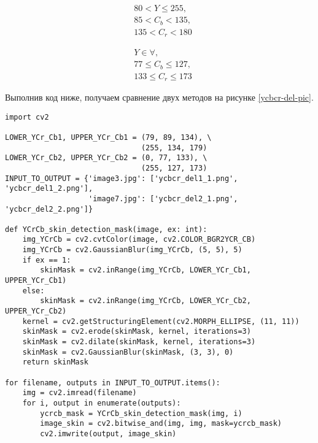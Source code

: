 \begin{equation}
	\begin{aligned}
		&80 < Y \leq 255, \\
		&85 < C_b < 135, \\
		&135 < C_r < 180 
	\end{aligned}
	\label{ycbcr-diap1}
\end{equation}

\begin{equation}
	\begin{aligned}
		&Y \in \forall,\\
		&77 \leq C_b \leq 127, \\
		&133 \leq C_r \leq 173 
	\end{aligned}
	\label{ycbcr-diap2}
\end{equation}

Выполнив код ниже, получаем сравнение двух методов на рисунке \ref{ycbcr-del-pic}.

\begin{verbatim}
import cv2

LOWER_YCr_Cb1, UPPER_YCr_Cb1 = (79, 89, 134), \
                               (255, 134, 179)
LOWER_YCr_Cb2, UPPER_YCr_Cb2 = (0, 77, 133), \
                               (255, 127, 173)
INPUT_TO_OUTPUT = {'image3.jpg': ['ycbcr_del1_1.png', 'ycbcr_del1_2.png'],
                   'image7.jpg': ['ycbcr_del2_1.png', 'ycbcr_del2_2.png']}

def YCrCb_skin_detection_mask(image, ex: int):
    img_YCrCb = cv2.cvtColor(image, cv2.COLOR_BGR2YCR_CB)
    img_YCrCb = cv2.GaussianBlur(img_YCrCb, (5, 5), 5)
    if ex == 1:
        skinMask = cv2.inRange(img_YCrCb, LOWER_YCr_Cb1, UPPER_YCr_Cb1)
    else:
        skinMask = cv2.inRange(img_YCrCb, LOWER_YCr_Cb2, UPPER_YCr_Cb2)
    kernel = cv2.getStructuringElement(cv2.MORPH_ELLIPSE, (11, 11))
    skinMask = cv2.erode(skinMask, kernel, iterations=3)
    skinMask = cv2.dilate(skinMask, kernel, iterations=3)
    skinMask = cv2.GaussianBlur(skinMask, (3, 3), 0)
    return skinMask

for filename, outputs in INPUT_TO_OUTPUT.items():
    img = cv2.imread(filename)
    for i, output in enumerate(outputs):
        ycrcb_mask = YCrCb_skin_detection_mask(img, i)
        image_skin = cv2.bitwise_and(img, img, mask=ycrcb_mask)
        cv2.imwrite(output, image_skin)
\end{verbatim}

\newpage


